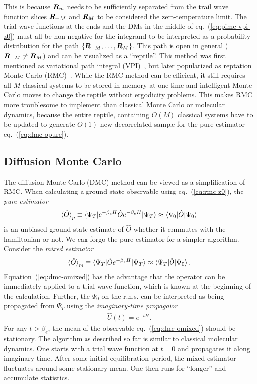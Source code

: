 This is because $\boldsymbol{R}_m$ needs to be sufficiently separated from the trail wave function slices $\boldsymbol{R}_{-M}$ and $\boldsymbol{R}_M$ to be considered the zero-temperature limit.
The trial wave functions at the ends and the DMs in the middle of eq.~(\ref{eq:pimc-vpi-z0}) must all be non-negative for the integrand to be interpreted as a probability distribution for the path $\{\boldsymbol{R}_{-M},\dots,\boldsymbol{R}_M\}$.
This path is open in general ($\boldsymbol{R}_{-M}\neq\boldsymbol{R}_M$) and can be visualized as a ``reptile''. This method was first mentioned as variational path integral (VPI)~\cite{Ceperley1995}, but later popularized as reptation Monte Carlo (RMC)~\cite{Baroni1999}.
While the RMC method can be efficient, it still requires all $M$ classical systems to be stored in memory at one time and intelligent Monte Carlo moves to change the reptile without ergodicity problems. This makes RMC more troublesome to implement than classical Monte Carlo or molecular dynamics, because the entire reptile, containing $O(M)$ classical systems have to be updated to generate $O(1)$ new decorrelated sample for the pure estimator eq.~(\ref{eq:dmc-opure}).

\subsection{Diffusion Monte Carlo} \label{sec:method-dmc}
The diffusion Monte Carlo (DMC) method can be viewed as a simplification of RMC.
When calculating a ground-state observable using eq.~(\ref{eq:rmc-z0}), the \emph{pure estimator}
\begin{align} \label{eq:dmc-opure}
\braket{\hat{O}}_p \equiv \braket{\Psi_T|e^{-\beta_e H}\hat{O}e^{-\beta_e H}|\Psi_T} \approx \braket{\Psi_0|\hat{O}|\Psi_0}
\end{align}
is an unbiased ground-state estimate of $\hat{O}$ whether it commutes with the hamiltonian or not. We can forgo the pure estimator for a simpler algorithm. Consider the \emph{mixed estimator}
\begin{align} \label{eq:dmc-omixed}
\braket{\hat{O}}_m \equiv \braket{\Psi_T|\hat{O}e^{-\beta_e H}|\Psi_T}\approx\braket{\Psi_T|\hat{O}|\Psi_0}.
\end{align}
Equation~(\ref{eq:dmc-omixed}) has the advantage that the operator can be immediately applied to a trial wave function, which is known at the beginning of the calculation. Further, the $\Psi_0$ on the r.h.s. can be interpreted as being propagated from $\Psi_T$ using the \emph{imaginary-time propagator}
\begin{align}
\hat{U}(t) = e^{-t H}.
\end{align}
For any $t>\beta_e$, the mean of the observable eq.~(\ref{eq:dmc-omixed}) should be stationary. The algorithm as described so far is similar to classical molecular dynamics. One starts with a trial wave function at $t=0$ and propagates it along imaginary time. After some initial equilibration period, the mixed estimator fluctuates around some stationary mean. One then runs for ``longer'' and accumulate statistics.

